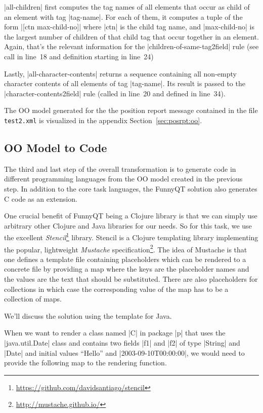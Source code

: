 \documentclass[submission]{eptcs}
\newcommand{\code}{\clojureinline}
\begin{document}
\code|all-children| first computes the tag names of all elements that occur as
child of an element with tag \code|tag-name|.  For each of them, it computes a
tuple of the form \code|[ctn max-child-no]| where \code|ctn| is the child tag
name, and \code|max-child-no| is the largest number of children of that child
tag that occur together in an element.  Again, that's the relevant information
for the \code|children-of-same-tag2field| rule (see call in line~18 and
definition starting in line~24)

Lastly, \code|all-character-contents| returns a sequence containing all
non-empty character contents of all elements of tag \code|tag-name|.  Its
result is passed to the \code|character-contents2field| rule (called in line~20
and defined in line~34).

The OO model generated for the the position report message contained in the
file \texttt{test2.xml} is visualized in the appendix
Section~\ref{sec:posrpt:oo}.

\subsection{OO Model to Code}
\label{sec:oo-model-to-code}

The third and last step of the overall transformation is to generate code in
different programming languages from the OO model created in the previous step.
In addition to the core task languages, the FunnyQT solution also generates C
code as an extension.

One crucial benefit of FunnyQT being a Clojure library is that we can simply
use arbitrary other Clojure and Java libraries for our needs.  So for this
task, we use the excellent
\emph{Stencil}\footnote{\url{https://github.com/davidsantiago/stencil}}
library.  Stencil is a Clojure templating library implementing the popular,
lightweight \emph{Mustache}
specification\footnote{\url{http://mustache.github.io/}}.  The idea of Mustache
is that one defines a template file containing placeholders which can be
rendered to a concrete file by providing a map where the keys are the
placeholder names and the values are the text that should be substituted.
There are also placeholders for collections in which case the corresponding
value of the map has to be a collection of maps.

We'll discuss the solution using the template for Java.


When we want to render a class named \code|C| in package \code|p| that uses the
\code|java.util.Date| class and contains two fields \code|f1| and \code|f2| of
type \code|String| and \code|Date| and initial values ``Hello'' and
\code|2003-09-10T00:00:00|, we would need to provide the following map to the
rendering function.
\end{document}
